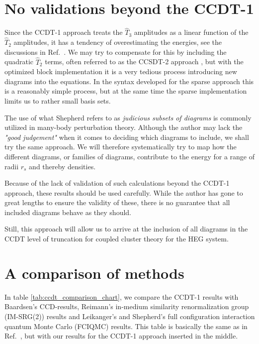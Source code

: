 


\FloatBarrier


\section{No validations beyond the CCDT-1}

Since the CCDT-1 approach treats the $\hat{T}_3$ amplitudes as a linear
function of the $\hat{T}_2$ amplitudes, it has a tendency of
overestimating the energies, see the discussions in Ref.~\cite[p.320]{ShavittBartlett2009}. We may
try to compensate for this by including the quadratic $\hat{T}_2$
terms, often referred to as the CCSDT-2 approach
\cite[p.320]{ShavittBartlett2009}, but with the optimized block
implementation it is a very tedious process introducing new diagrams
into the equations. In the syntax developed for the sparse approach
this is a reasonably simple process, but at the same time the sparse
implementation limits us to rather small basis sets.

The use of what Shepherd refers to as \emph{judicious subsets of  diagrams} 
\cite{Shepherd2014} is commonly utilized in many-body
perturbation theory. Although the author may lack the \emph{"good judgement"} 
when it comes to deciding which diagrams to include, we
shall try the same approach. We will therefore systematically try to
map how the different diagrams, or families of diagrams, contribute
to the energy for a range of radii $r_s$ and thereby densities.

Because of the lack of validation of such calculations beyond the
CCDT-1 approach, these results should be used carefully. While the author has
gone to great lengths to ensure the validity of these, there is no
guarantee that all included diagrams behave as they should.

Still, this approach will allow us to arrive at the inclusion of all diagrams in the CCDT level of truncation for coupled cluster theory for the HEG system. 

\FloatBarrier

\section{A comparison of methods}

In table \ref{tab:ccdt_comparison_chart}, we compare the CCDT-1
results with Baardsen's \cite{Baardsen2014} CCD-results, Reimann's
in-medium similarity renormalization group (IM-SRG(2)) results \cite{Reimann2013} and Leikanger's
\cite{Leikanger2013} and Shepherd's \cite{Shepherd2012} full configuration interaction quantum Monte Carlo (FCIQMC)
results. This table is basically the same as in
Ref.~\cite[p.104]{Baardsen2014}, but with our results for the CCDT-1 approach
inserted in the middle.

